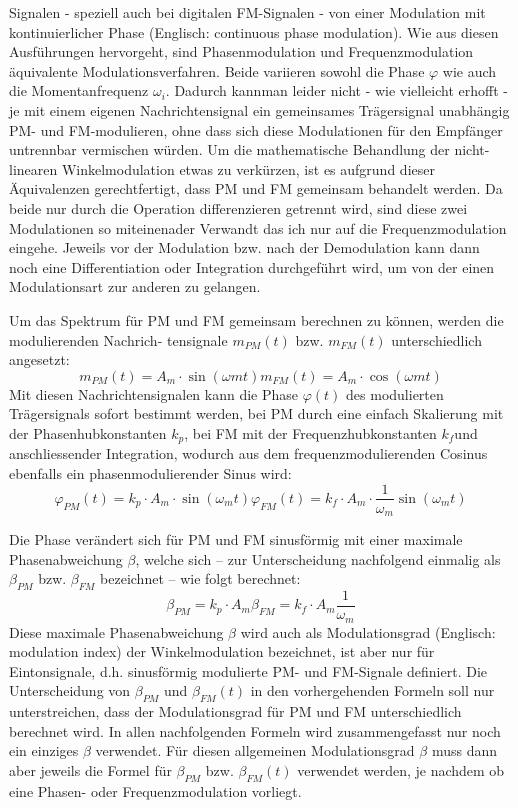 Signalen - speziell auch bei digitalen FM-Signalen - von einer Modulation mit kontinuierlicher Phase (Englisch: continuous phase modulation).
Wie aus diesen Ausführungen hervorgeht, sind Phasenmodulation und Frequenzmodulation äquivalente Modulationsverfahren.
Beide variieren sowohl die Phase \(\varphi\) wie auch die Momentanfrequenz \(\omega_i.\)
Dadurch kannman leider nicht - wie vielleicht erhofft - je mit einem eigenen Nachrichtensignal ein gemeinsames Trägersignal unabhängig PM- und FM-modulieren,
 ohne dass sich diese Modulationen für den Empfänger untrennbar vermischen würden.
Um die mathematische Behandlung der nicht-linearen Winkelmodulation etwas zu verkürzen, ist es aufgrund dieser Äquivalenzen gerechtfertigt,
dass PM und FM gemeinsam behandelt werden. 
Da beide nur durch die Operation differenzieren getrennt wird, sind diese zwei Modulationen so miteinenader Verwandt das ich nur auf die Frequenzmodulation eingehe.
Jeweils vor der Modulation bzw. nach der Demodulation kann dann noch eine Differentiation oder 
Integration durchgeführt wird, um von der einen Modulationsart zur anderen zu gelangen.
\citeauthor{fm:NAT}

Um das Spektrum für PM und FM gemeinsam berechnen zu können, werden die modulierenden Nachrich-
tensignale \(m_{PM}(t)\) bzw. \(m_{FM}(t)\) unterschiedlich angesetzt:
\[
    m_{PM}(t) = A_m \cdot \sin(\omega m t) 
    m_{FM}(t) = A_m \cdot \cos(\omega m t)
\]
Mit diesen Nachrichtensignalen kann die Phase \(\varphi(t)\) des modulierten Trägersignals sofort bestimmt werden,
bei PM durch eine einfach Skalierung mit der Phasenhubkonstanten \(k_p\), 
bei FM mit der Frequenzhubkonstanten \(k_f\)und anschliessender Integration, 
wodurch aus dem frequenzmodulierenden Cosinus ebenfalls ein phasenmodulierender Sinus wird:
\[
    \varphi_{PM}(t) = k_p \cdot A_m \cdot \sin(\omega_m t)
    \varphi_{FM}(t) = k_f \cdot A_m \cdot \frac{1}{\omega_m} \sin(\omega_m t)
\]

Die Phase verändert sich für PM und FM sinusförmig mit einer maximale Phasenabweichung \(\beta\),
 welche sich -- zur Unterscheidung nachfolgend einmalig als \(\beta_{PM}\) bzw. \(\beta_{FM}\) bezeichnet -- wie folgt berechnet:
\[
    \beta_{PM} = k_p \cdot A_m
    \beta_{FM} = k_f \cdot A_m \frac{1}{\omega_m} 
\]
Diese maximale Phasenabweichung \(\beta\) wird auch als Modulationsgrad (Englisch: modulation index) der Winkelmodulation bezeichnet, ist aber nur für Eintonsignale,
 d.h. sinusförmig modulierte PM- und FM-Signale definiert. 
Die Unterscheidung von \(\beta_{PM}\) und \(\beta_{FM}(t)\) in den vorhergehenden Formeln soll nur unterstreichen, dass
der Modulationsgrad für PM und FM unterschiedlich berechnet wird.
In allen nachfolgenden Formeln wird zusammengefasst nur noch ein einziges \(\beta\) verwendet. 
Für diesen allgemeinen Modulationsgrad \(\beta\) muss dann aber jeweils die Formel für \(\beta_{PM}\) bzw. \(\beta_{FM}(t)\) verwendet werden,
 je nachdem ob eine Phasen- oder Frequenzmodulation vorliegt.


